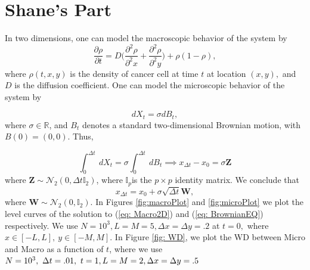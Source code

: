\documentclass[10pt]{article}
\begin{document}
\section{Shane's Part}
In two dimensions, one can model the macroscopic behavior of the system by
\begin{equation}
\frac{\partial \rho}{\partial t} = D\Big(\frac{\partial^2 \rho}{\partial^2 x} + \frac{\partial^2 \rho}{\partial^2 y}\Big) + \rho(1-\rho),
\label{eq: Macro2D}
\end{equation}
where $\rho(t,x,y)$ is the density of cancer cell at time $t$ at location $(x,y),$ and $D$ is the diffusion coefficient. One can model the microscopic behavior of the system by 

\begin{equation}
dX_t = \sigma dB_t,
\label{eq: MicroModel2}
\end{equation}
where $\sigma \in \mathbb{R}$, and $B_t$ denotes a standard two-dimensional Brownian motion, with $B(0) = (0,0)$. Thus,

\begin{equation}
\int_0^{\Delta t} \ dX_t = \sigma \int_{0}^{\Delta t} \ dB_t \implies x_{\Delta t} - x_0 = \sigma \textbf{Z}
\end{equation}
where $\textbf{Z} \sim \mathcal{N}_2(0, \Delta t \mathbb{I}_2)$, where $\mathbb{I}_p$is the $p \times p$ identity matrix. We conclude that
\begin{equation}
x_{\Delta t} = x_0 + \sigma \sqrt{\Delta t}\textbf{W},
\label{eq: BrownianEQ}
\end{equation} 
where $\textbf{W} \sim \mathcal{N}_2(0, \mathbb{I}_2).$ In Figures \ref{fig:macroPlot} and \ref{fig:microPlot} we plot the level curves of the solution to (\ref{eq: Macro2D}) and (\ref{eq: BrownianEQ}) respectively. We use $N = 10^3, L = M = 5, \Delta x = \Delta y = .2$ at $t = 0,$ where $x \in [-L, L], \ y \in [-M, M]$.
In Figure \ref{fig: WD}, we plot the WD between Micro and Macro as a function of $t$, where we use $N = 10^3,\ \Delta t = .01, \ t = 1, \\ L = M  = 2, \Delta x = \Delta y = .5$ 
\end{document}
